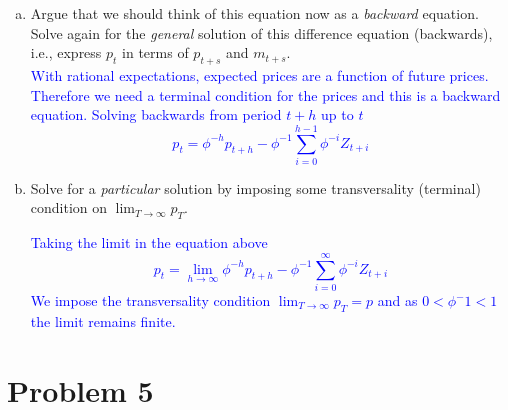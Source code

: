 \documentclass[11pt]{extarticle}
\theoremstyle{plain}
\theoremstyle{definition}
\begin{document}
\begin{enumerate}[(a)]
\item Argue that we should think of this equation now as a \textit{backward} equation. Solve again for the \textit{general} solution of this difference equation (backwards), i.e., express $p_t$ in terms of $p_{t+s}$ and $m_{t+s}$.\\
\textcolor{blue}{With rational expectations, expected prices are a function of future prices. Therefore we need a terminal condition for the prices and this is a backward equation. Solving backwards from period $t+h$ up to $t$ $$
p_t = \phi^{-h} p_{t+h}-\phi^{-1} \sum_{i=0}^{h-1} \phi^{-i} Z_{t+i}
$$} 

\item Solve for a \textit{particular} solution by imposing some transversality (terminal) condition on $\lim_{T \to \infty} p_T$. 

\textcolor{blue}{Taking the limit in the equation above $$p_t=\lim_{h \to \infty}\phi^{-h}p_{t+h}-\phi^{-1} \sum_{i=0}^{\infty} \phi^{-i} Z_{t+i}$$
We impose the transversality condition $\lim_{T \to \infty} p_T=p$ and as $0<\phi^-1<1$ the limit remains finite.}

\end{enumerate}


\vspace{10mm}
\section*{Problem 5}
\end{document}
